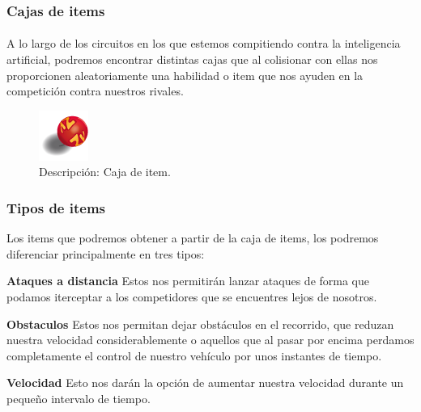 \subsubsection{Cajas de items} 

\paragraph{}
A lo largo de los circuitos en los que estemos compitiendo contra la inteligencia artificial, 
podremos encontrar distintas cajas que al colisionar con ellas nos proporcionen aleatoriamente una habilidad o item que nos
ayuden en la competición contra nuestros rivales.

\begin{figure}[H]
	\label{item_box}
	\begin{center}
		\includegraphics[scale=1]{imagenes/items/item_box.png}
	\end{center}
	\caption{Descripción: Caja de item.}
\end{figure}

\subsubsection{Tipos de items}

Los items que podremos obtener a partir de la caja de items, los podremos diferenciar principalmente en tres tipos:

\begin{description}
	\item \textbf{Ataques a distancia} Estos nos permitirán lanzar ataques de forma que podamos iterceptar a los competidores que 
	se encuentres lejos de nosotros.
	
	\item \textbf{Obstaculos} Estos nos permitan dejar obstáculos en el recorrido, que reduzan nuestra velocidad considerablemente
	o aquellos que al pasar por encima perdamos completamente el control de nuestro vehículo por unos instantes de tiempo.
	
	\item \textbf{Velocidad} Esto nos darán la opción de aumentar nuestra velocidad durante un pequeño intervalo de tiempo.
\end{description}
